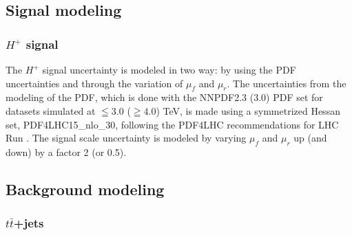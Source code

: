 \begin{description}
\end{description}
\subsection{Signal modeling}
\label{subsec:SystOfSigModelling}

\subsubsection{$H^{+}$ signal}
\setcounter{num}{2}
The $H^{+}$ signal uncertainty is modeled in two way: by using the PDF uncertainties and through the variation of $\mu_{f}$ and $\mu_{r}$. The uncertainties from the modeling of the PDF, which is done with the NNPDF2.3 (3.0) PDF set for datasets simulated at ${\leqq}3.0$ (${\geqq4.0}$) TeV, is made using a symmetrized Hessan set, PDF4LHC15\_nlo\_30, following the PDF4LHC recommendations for LHC Run  \cite{Butterworth:2015oua}. The signal scale uncertainty is modeled by varying $\mu_{f}$ and $\mu_{r}$ up (and down) by a factor 2 (or 0.5).
\subsection{Background modeling}
\label{subsec:SystOfBkgModeling}

\subsubsection{$t\bar{t}$+jets}
\label{subsec:SystOfTtbar}

